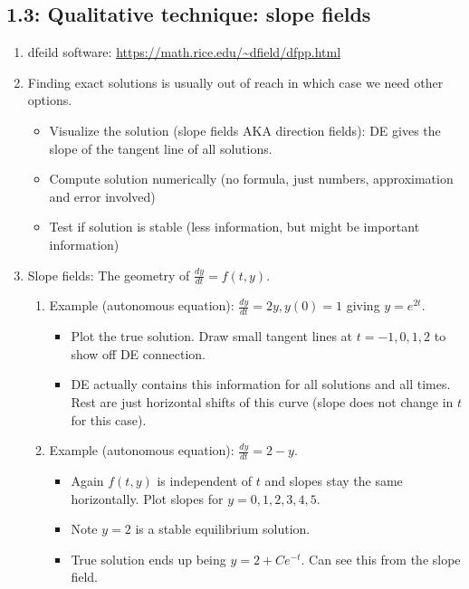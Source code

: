 \documentclass{article}
\newcommand{\ds}{\displaystyle}
\begin{document}
\subsection{1.3: Qualitative technique: slope fields}

\begin{enumerate}

\item dfeild software: \url{https://math.rice.edu/~dfield/dfpp.html}

\item Finding exact solutions is usually out of reach in which case we need other options.
\begin{itemize}
\item Visualize the solution (slope fields AKA direction fields): DE gives the slope of the tangent line of all solutions.
\item Compute solution numerically (no formula, just numbers, approximation and error involved)
\item Test if solution is stable (less information, but might be important information)
\end{itemize}

\item Slope fields: The geometry of $\ds \frac{dy}{dt} = f(t,y)$.
\begin{enumerate}
\item Example (autonomous equation): $\ds \frac{dy}{dt} = 2y, y(0)=1$ giving $y=e^{2t}$.
\begin{itemize}
\item Plot the true solution. Draw small tangent lines at $t=-1,0,1,2$ to show off DE connection. 
\item DE actually contains this information for all solutions and all times. Rest are just horizontal shifts of this curve (slope does not change in $t$ for this case).
\end{itemize}

\item Example (autonomous equation): $\ds \frac{dy}{dt} = 2-y$. 
\begin{itemize}
\item Again $f(t,y)$ is independent of $t$ and slopes stay the same horizontally. Plot slopes for $y=0,1,2,3,4,5$.
\item Note $y=2$ is a stable equilibrium solution. 
\item True solution ends up being $y=2+Ce^{-t}$. Can see this from the slope field.
\end{itemize}


\end{enumerate}
\end{enumerate}
\end{document}
